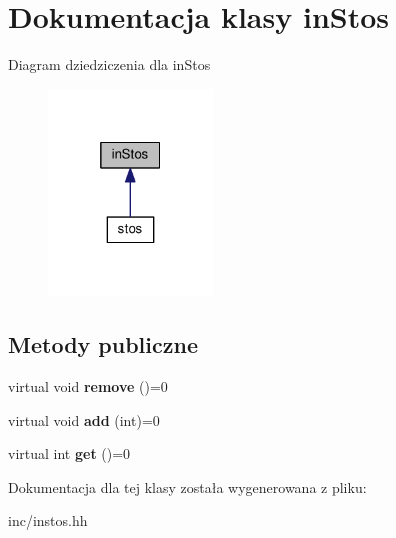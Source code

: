 \section{Dokumentacja klasy in\+Stos}
\label{classin_stos}


Diagram dziedziczenia dla in\+Stos
\nopagebreak
\begin{figure}[H]
\begin{center}
\leavevmode
\includegraphics[width=124pt]{classin_stos__inherit__graph}
\end{center}
\end{figure}
\subsection*{Metody publiczne}
\begin{DoxyCompactItemize}
\item 
virtual void {\bfseries remove} ()=0\label{classin_stos_a8cbd9941b251f12f8dbead239f5117e8}

\item 
virtual void {\bfseries add} (int)=0\label{classin_stos_a4eec0b97e9e0e7043decb1b39cd9da4b}

\item 
virtual int {\bfseries get} ()=0\label{classin_stos_a7caf60f2603a69cdee579ababf61e021}

\end{DoxyCompactItemize}


Dokumentacja dla tej klasy została wygenerowana z pliku\+:\begin{DoxyCompactItemize}
\item 
inc/instos.\+hh\end{DoxyCompactItemize}
